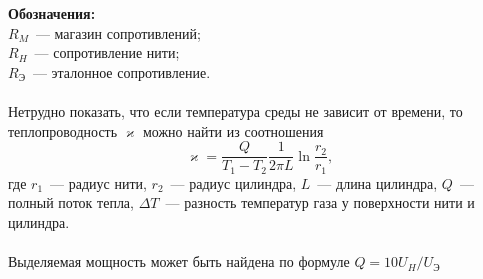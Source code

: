 \documentclass[a4paper,12pt]{article} %
\begin{document}
\noindent\textbf{Обозначения:\\}
$ R_M $~--- магазин сопротивлений;\\
$ R_H $~--- сопротивление нити;\\
$ R_Э $~--- эталонное сопротивление.\\\\
Нетрудно показать, что если температура среды не зависит от времени, то 
теплопроводность $ \varkappa $ можно найти из соотношения
\begin{equation}\label{kappa}
	\varkappa=\dfrac{Q}{T_1-T_2}\dfrac{1}{2\pi L}\ln{\dfrac{r_2}{r_1}},
\end{equation}
где $ r_1 $~--- радиус нити, $ r_2 $~--- радиус цилиндра, 
$ L $~--- длина цилиндра, $ Q $~--- полный поток тепла,
$ \Delta T $~--- разность температур газа у поверхности нити и цилиндра.\\\\
Выделяемая мощность может быть найдена по формуле $ Q=10U_H/U_Э $
\newpage
\end{document}
